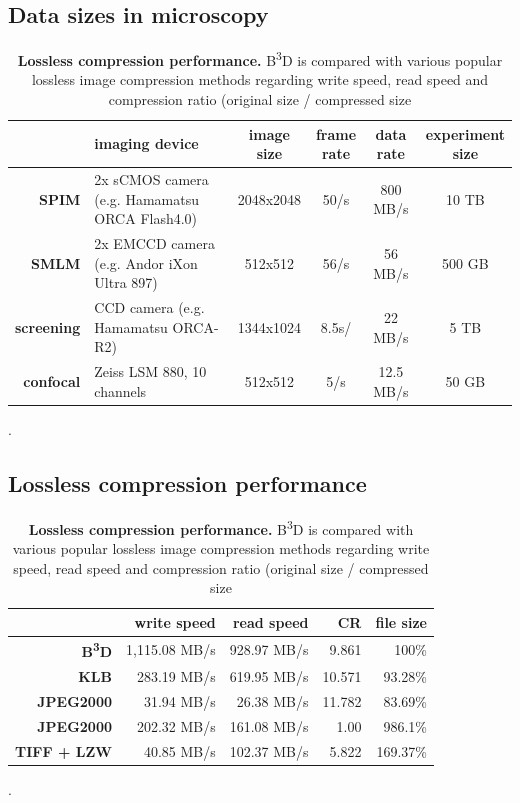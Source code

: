 \documentclass{diploma_style}
\newcommand{\bbbd}{B\textsuperscript{3}D }
\begin{document}
\subsection{Data sizes in microscopy}
\begin{table}[tbp]
\renewcommand{\arraystretch}{2}
\centering
\begin{tabular}{rp{5cm}cccc}
	& \textbf{imaging device} & \textbf{image size} &  \parbox[c]{1cm}{\textbf{frame}\\ \textbf{rate}} & \textbf{data rate} & \parbox[c]{2cm}{\textbf{experiment\\ size}} \\
	\hline
	\hline
	\textbf{SPIM} & 2x sCMOS camera (e.g. Hamamatsu ORCA Flash4.0) & 2048x2048 & 50/s & 800 MB/s & 10 TB \\ \hline
	\textbf{SMLM} & 2x EMCCD camera (e.g. Andor iXon Ultra 897) & 512x512 & 56/s & 56 MB/s & 500 GB \\ \hline
	\textbf{screening} & CCD camera (e.g. Hamamatsu ORCA-R2) & 1344x1024 & 8.5s/ & 22 MB/s & 5 TB \\ \hline
	\textbf{confocal} & Zeiss LSM 880, 10 channels & 512x512 & 5/s & 12.5 MB/s & 50 GB \\ 
\end{tabular}
\caption{\textbf{Lossless compression performance.} \bbbd is compared with various popular lossless image compression methods regarding write speed, read speed and compression ratio (original size / compressed size}.
\label{tab:performance}
\end{table}

\subsection{Lossless compression performance}
\begin{table}[tbp]
\renewcommand{\arraystretch}{2}
\setlength{\tabcolsep}{9pt}
\centering
\begin{tabular}{rrrrr}
	& \textbf{write speed} & \textbf{read speed} & \textbf{CR} & \textbf{file size} \\
	\hline
	\hline
	\textbf{\bbbd} & 1,115.08 MB/s & 928.97 MB/s & 9.861 & 100\% \\ \hline
	\textbf{KLB} & 283.19 MB/s & 619.95 MB/s & 10.571 & 93.28\% \\ \hline
	\textbf{JPEG2000} & 31.94 MB/s & 26.38 MB/s & 11.782 & 83.69\% \\ \hline
	\textbf{JPEG2000} & 202.32 MB/s & 161.08 MB/s & 1.00 & 986.1\% \\ \hline
	\textbf{TIFF + LZW} & 40.85 MB/s & 102.37 MB/s & 5.822 & 169.37\%
\end{tabular}
\caption{\textbf{Lossless compression performance.} \bbbd is compared with various popular lossless image compression methods regarding write speed, read speed and compression ratio (original size / compressed size}.
\label{tab:performance}
\end{table}
\end{document}
